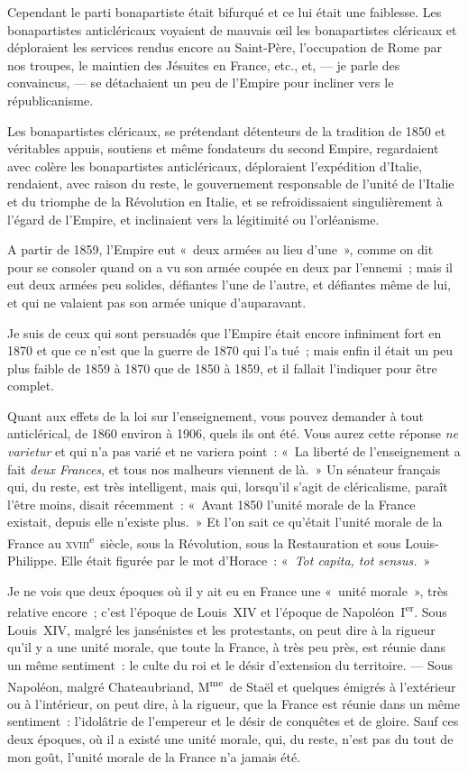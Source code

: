 \documentclass[french,twoside]{book} %
\begin{document}
Cependant le parti bonapartiste était bifurqué et ce lui était une faiblesse. Les bonapartistes anticléricaux voyaient de mauvais œil les bonapartistes cléricaux et déploraient les services rendus encore au Saint-Père, l’occupation de Rome par nos troupes, le maintien des Jésuites en France, etc., et, — je parle des convaincus, — se détachaient un peu de l’Empire pour incliner vers le républicanisme.\par
Les bonapartistes cléricaux, se prétendant détenteurs  de la tradition de 1850 et véritables appuis, soutiens et même fondateurs du second Empire, regardaient avec colère les bonapartistes anticléricaux, déploraient l’expédition d’Italie, rendaient, avec raison du reste, le gouvernement responsable de l’unité de l’Italie et du triomphe de la Révolution en Italie, et se refroidissaient singulièrement à l’égard de l’Empire, et inclinaient vers la légitimité ou l’orléanisme.\par
A partir de 1859, l’Empire eut « deux armées au lieu d’une », comme on dit pour se consoler quand on a vu son armée coupée en deux par l’ennemi ; mais il eut deux armées peu solides, défiantes l’une de l’autre, et défiantes même de lui, et qui ne valaient pas son armée unique d’auparavant.\par
Je suis de ceux qui sont persuadés que l’Empire était encore infiniment fort en 1870 et que ce n’est que la guerre de 1870 qui l’a tué ; mais enfin il était un peu plus faible de 1859 à 1870 que de 1850 à 1859, et il fallait l’indiquer pour être complet.\par
Quant aux effets de la loi sur l’enseignement, vous pouvez demander à tout anticlérical, de 1860 environ à 1906, quels ils ont été. Vous aurez cette réponse {\itshape ne varietur} et qui n’a pas varié et ne variera point : « La liberté de l’enseignement a fait {\itshape deux Frances}, et tous nos malheurs viennent de là. » Un sénateur français qui, du reste, est très intelligent,  mais qui, lorsqu’il s’agit de cléricalisme, paraît l’être moins, disait récemment : « Avant 1850 l’unité morale de la France existait, depuis elle n’existe plus. » Et l’on sait ce qu’était l’unité morale de la France au \textsc{xviii}\textsuperscript{e} siècle, sous la Révolution, sous la Restauration et sous Louis-Philippe. Elle était figurée par le mot d’Horace : « {\itshape Tot capita, tot sensus.} »\par
Je ne vois que deux époques où il y ait eu en France une « unité morale », très relative encore ; c’est l’époque de Louis XIV et l’époque de Napoléon I\textsuperscript{er}. Sous Louis XIV, malgré les jansénistes et les protestants, on peut dire à la rigueur qu’il y a une unité morale, que toute la France, à très peu près, est réunie dans un même sentiment : le culte du roi et le désir d’extension du territoire. — Sous Napoléon, malgré Chateaubriand, M\textsuperscript{me} de Staël et quelques émigrés à l’extérieur ou à l’intérieur, on peut dire, à la rigueur, que la France est réunie dans un même sentiment : l’idolâtrie de l’empereur et le désir de conquêtes et de gloire. Sauf ces deux époques, où il a existé une unité morale, qui, du reste, n’est pas du tout de mon goût, l’unité morale de la France n’a jamais été.\par
\end{document}

